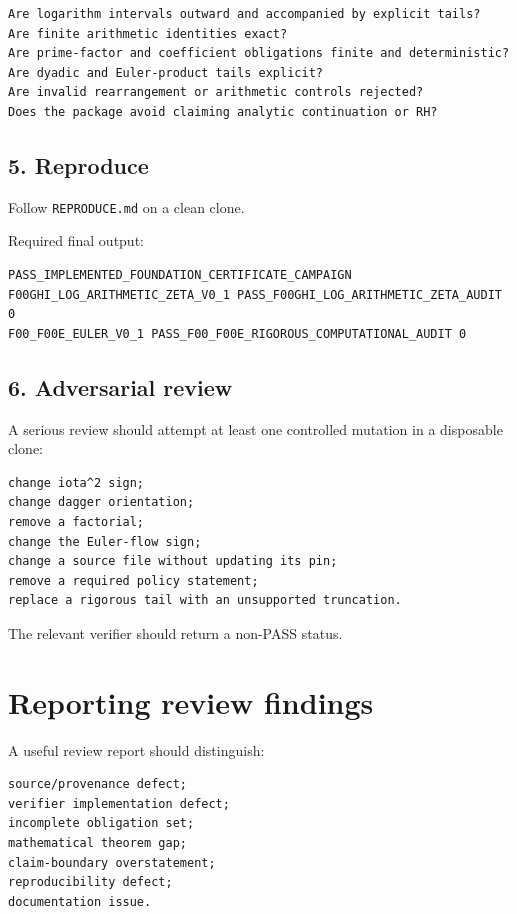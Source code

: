 \begin{verbatim}
Are logarithm intervals outward and accompanied by explicit tails?
Are finite arithmetic identities exact?
Are prime-factor and coefficient obligations finite and deterministic?
Are dyadic and Euler-product tails explicit?
Are invalid rearrangement or arithmetic controls rejected?
Does the package avoid claiming analytic continuation or RH?
\end{verbatim}

\hypertarget{reproduce}{%
\subsection{5. Reproduce}\label{reproduce}}

Follow \texttt{REPRODUCE.md} on a clean clone.

Required final output:

\begin{verbatim}
PASS_IMPLEMENTED_FOUNDATION_CERTIFICATE_CAMPAIGN
F00GHI_LOG_ARITHMETIC_ZETA_V0_1 PASS_F00GHI_LOG_ARITHMETIC_ZETA_AUDIT 0
F00_F00E_EULER_V0_1 PASS_F00_F00E_RIGOROUS_COMPUTATIONAL_AUDIT 0
\end{verbatim}

\hypertarget{adversarial-review}{%
\subsection{6. Adversarial review}\label{adversarial-review}}

A serious review should attempt at least one controlled mutation in a disposable clone:

\begin{verbatim}
change iota^2 sign;
change dagger orientation;
remove a factorial;
change the Euler-flow sign;
change a source file without updating its pin;
remove a required policy statement;
replace a rigorous tail with an unsupported truncation.
\end{verbatim}

The relevant verifier should return a non-PASS status.

\hypertarget{reporting-review-findings}{%
\section{Reporting review findings}\label{reporting-review-findings}}

A useful review report should distinguish:

\begin{verbatim}
source/provenance defect;
verifier implementation defect;
incomplete obligation set;
mathematical theorem gap;
claim-boundary overstatement;
reproducibility defect;
documentation issue.
\end{verbatim}

